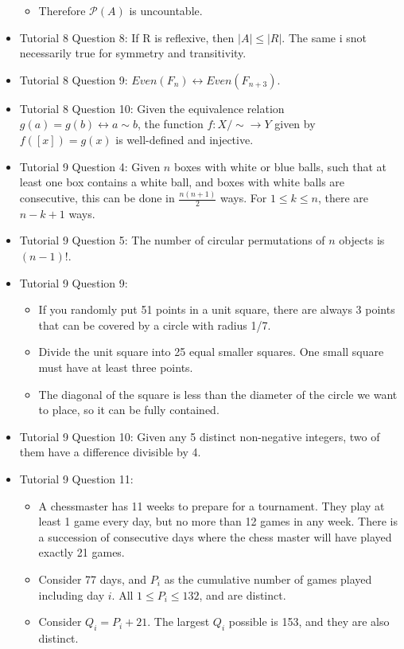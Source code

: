 \documentclass[10pt, portrait]{article}
\begin{document}
\begin{multicols*}{2}
\begin{itemize}
\begin{itemize}
        \item Therefore $\mathcal{P}(A)$ is uncountable.
    \end{itemize}
    \item Tutorial 8 Question 8: If R is reflexive, then $|A| \leq |R|$. The same i snot necessarily true for symmetry and transitivity.
    \item Tutorial 8 Question 9: $Even(F_n) \leftrightarrow Even(F_{n+3})$.
    \item Tutorial 8 Question 10: Given the equivalence relation $g(a) = g(b) \leftrightarrow a \sim b$, the function $f : X/\sim \rightarrow Y$ given by $f([x]) = g(x)$ is well-defined and injective.
    \item Tutorial 9 Question 4: Given $n$ boxes with white or blue balls, such that at least one box contains a white ball, and boxes with white balls are consecutive, this can be done in $\frac{n(n+1)}{2}$ ways. For $1 \leq k \leq n$, there are $n-k+1$ ways.
    \item Tutorial 9 Question 5: The number of circular permutations of $n$ objects is $(n-1)!$.
    \item Tutorial 9 Question 9:
    \begin{itemize}
        \item If you randomly put 51 points in a unit square, there are always 3 points that can be covered by a circle with radius 1/7.
        \item Divide the unit square into 25 equal smaller squares. One small square must have at least three points. 
        \item The diagonal of the square is less than the diameter of the circle we want to place, so it can be fully contained.
    \end{itemize}
    \item Tutorial 9 Question 10: Given any 5 distinct non-negative integers, two of them have a difference divisible by 4.
    \item Tutorial 9 Question 11:
    \begin{itemize}
        \item A chessmaster has 11 weeks to prepare for a tournament. They play at least 1 game every day, but no more than 12 games in any week. There is a succession of consecutive days where the chess master will have played exactly 21 games.
        \item Consider 77 days, and $P_i$ as the cumulative number of games played including day $i$. All $1 \leq P_i \leq 132$, and are distinct. 
        \item Consider $Q_i = P_i+21$. The largest $Q_i$ possible is 153, and they are also distinct. 

\end{itemize}
\end{itemize}
\end{multicols*}
\end{document}
